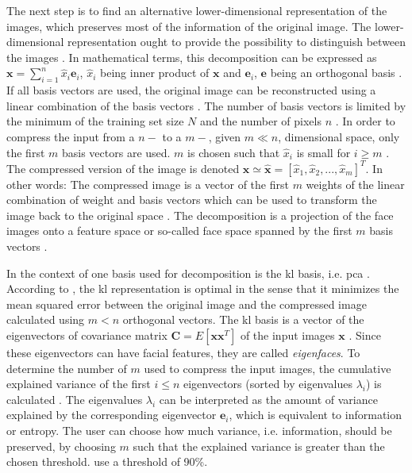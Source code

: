 The next step is to find an alternative lower-dimensional representation of the images, which preserves most of the information of the original image.
The lower-dimensional representation ought to provide the possibility to distinguish between the images \cite{eigenfaces1991}.
In mathematical terms, this decomposition can be expressed as 
$\textbf{x} = \sum_{i=1}^{n}\hat{x}_{i} \textbf{e}_{i}$, 
$\hat{x}_{i}$ being inner product of $\textbf{x}$ and $\textbf{e}_{i}$, 
$\textbf{e}$ being an orthogonal basis 
\cite{eigenfaces1997}.
If all basis vectors are used, the original image can be reconstructed using a linear combination of the basis vectors \cite{eigenfaces1991, face-recognition2020}.
The number of basis vectors is limited by the minimum of the training set size $N$ \cite{eigenfaces1991} and the number of pixels $n$ \cite{face-recognition2020}.
In order to compress the input from a $n-$ to a $m-$, given $m \ll n$, dimensional space, only the first $m$ basis vectors are used.
$m$ is chosen such that $\hat{x}_{i}$ is small for $i \ge m$ \cite{eigenfaces1997}.
The compressed version of the image is denoted $\textbf{x} \simeq \hat{\textbf{x}} = \left[\hat{x}_{1}, \hat{x}_{2}, ..., \hat{x}_{m}  \right]^{T}$.
In other words: 
The compressed image is a vector of the first $m$ weights of the linear combination of weight and basis vectors which can be used to transform the image back to the original space \cite{eigenfaces1991}.
The decomposition is a projection of the face images onto a feature space or so-called face space spanned by the first $m$ basis vectors \cite{eigenfaces1991}.

In the context of \eigenfaces{} one basis used for decomposition is the \ac{kl} basis, i.e. \ac{pca} \cite{eigenfaces1997, eigenfaces1991}.
According to \citeauthor{eigenfaces1997}, the \ac{kl} representation is optimal in the sense that it minimizes the mean squared error between the original image and 
the compressed image calculated using $m < n$ orthogonal vectors.
The \ac{kl} basis is a vector of the eigenvectors of covariance matrix $\textbf{C} = E\left[ \textbf{x}\textbf{x}^{T} \right]$ of the input images $\mathbf{x}$ \cite{eigenfaces1997}.
Since these eigenvectors can have facial features, they are called \textit{eigenfaces}.
To determine the number of \eigenfaces{} $m$ used to compress the input images, the cumulative explained variance of the first $i \le n$ eigenvectors (sorted by eigenvalues $\lambda_i$) is calculated 
\cite{eigenfaces1997, face-recognition2020, face-recognition2021}.
The eigenvalues $\lambda_i$ can be interpreted as the amount of variance explained by the corresponding eigenvector $\textbf{e}_i$, which is equivalent to information or entropy.
The user can choose how much variance, i.e. information, should be preserved, by choosing $m$ such that the explained variance is greater than the chosen threshold.
\citeauthor{face-recognition2021} use a threshold of 90\%.

